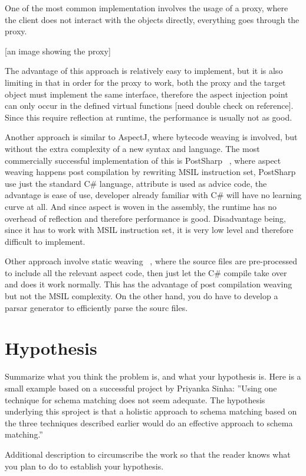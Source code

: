 One of the most common implementation involves the usage of a proxy, where the client does not interact with the objects directly, everything goes through the proxy.

[an image showing the proxy]

The advantage of this approach is relatively easy to implement, but it is also limiting in that in order for the proxy to work, both the proxy and the target object must implement the same interface, therefore the aspect injection point can only occur in the defined virtual functions [need double check on reference]. Since this require reflection at runtime, the performance is usually not as good.

Another approach is similar to AspectJ, where bytecode weaving is involved, but without the extra complexity of a new syntax and language. The most commercially successful implementation of this is PostSharp ~\cite{postsharp}, where aspect weaving happens post compilation by rewriting MSIL instruction set, PostSharp use just the standard C\# language, attribute is used as advice code, the advantage is ease of use, developer already familiar with C\# will have no learning curve at all. And since aspect is woven in the assembly, the runtime has no overhead of reflection and therefore performance is good. Disadvantage being, since it has to work with MSIL instruction set, it is very low level and therefore difficult to implement.

Other approach involve static weaving ~\cite{aspectcs}, where the source files are pre-processed to include all the relevant aspect code, then just let the C\# compile take over and does it work normally. This has the advantage of post compilation weaving but not the MSIL complexity. On the other hand, you do have to develop a parsar generator to efficiently parse the sourc files.

\section{Hypothesis}
Summarize what you think the problem is, and what your hypothesis
is. Here is a small example based on a successful project by Priyanka
Sinha: ''Using one technique for schema matching does not seem
adequate. The hypothesis underlying this sproject is that a holistic
approach to schema matching based on the three techniques described
earlier would do an effective approach to schema matching.''

Additional description to circumscribe the work so that the reader
knows what you plan to do to establish your hypothesis.

